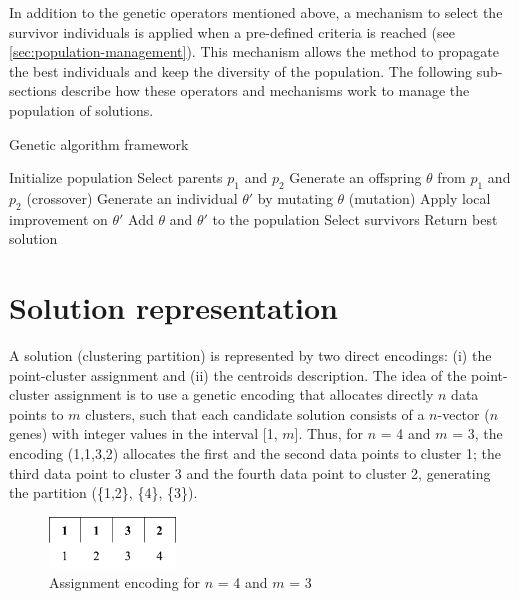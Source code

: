 In addition to the genetic operators mentioned above, a mechanism to select the survivor individuals is applied when a pre-defined criteria is reached (see \ref{sec:population-management}). This mechanism allows the method to propagate the best individuals and keep the diversity of the population. The following sub-sections describe how these operators and mechanisms work to manage the population of solutions.

\begin{algorithm}[!h]
\caption{Genetic algorithm framework}
\label{genetic-algo}
\begin{algorithmic}[1]
\STATE Initialize population
\STATE Select parents $p_1$ and $p_2$
\STATE Generate an offspring $\theta$ from $p_1$ and $p_2$ (crossover)
\STATE Generate an individual $\theta'$ by mutating $\theta$ (mutation)
\STATE Apply local improvement on $\theta'$
\STATE Add $\theta$ and $\theta'$ to the population
\STATE Select survivors
\ENDIF
\ENDWHILE
\STATE Return best solution
\end{algorithmic}
\end{algorithm}

\section{Solution representation}
\label{sec:solution-representation}
A solution (clustering partition) is represented by two direct encodings: (i) the point-cluster assignment and (ii) the centroids description. The idea of the point-cluster assignment is to use a genetic encoding that allocates directly $n$ data points to $m$ clusters, such that each candidate solution consists of a $n$-vector ($n$ genes) with integer values in the interval [1, $m$]. Thus, for $n$ = 4 and $m$ = 3, the encoding (1,1,3,2) allocates the first and the second data points to cluster 1; the third data point to cluster 3 and the fourth data point to cluster 2, generating the partition (\{1,2\}, \{4\}, \{3\}).

\begin{figure}[h]
  \begin{center}
    \includegraphics[width=0.3\textwidth]{img/assignment-encoding}
    \caption{Assignment encoding for $n$ = 4 and $m$ = 3}\label{fig:assignment-encoding}
  \end{center}
\end{figure}


